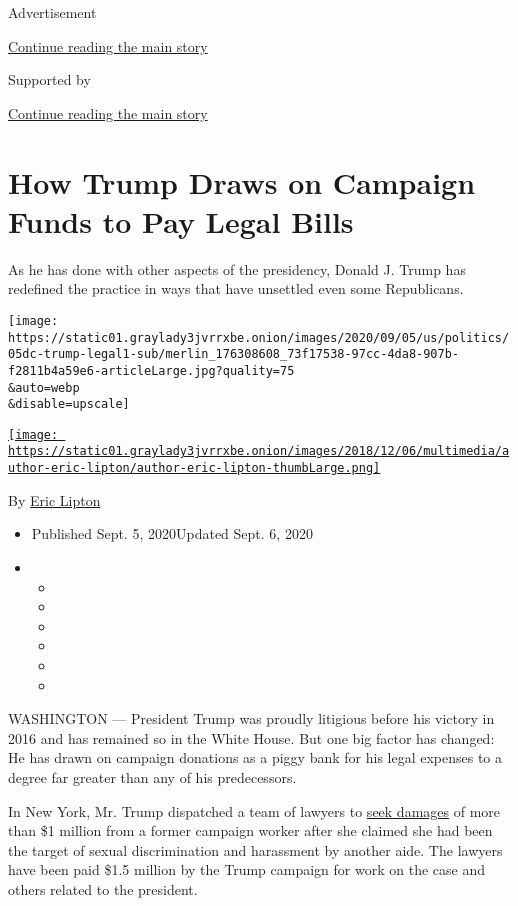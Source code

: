 Advertisement

\protect\hyperlink{after-top}{Continue reading the main story}

Supported by

\protect\hyperlink{after-sponsor}{Continue reading the main story}

\hypertarget{how-trump-draws-on-campaign-funds-to-pay-legal-bills}{%
\section{How Trump Draws on Campaign Funds to Pay Legal
Bills}\label{how-trump-draws-on-campaign-funds-to-pay-legal-bills}}

As he has done with other aspects of the presidency, Donald J. Trump has
redefined the practice in ways that have unsettled even some
Republicans.

\texttt{[image: https://static01.graylady3jvrrxbe.onion/images/2020/09/05/us/politics/05dc-trump-legal1-sub/merlin\_176308608\_73f17538-97cc-4da8-907b-f2811b4a59e6-articleLarge.jpg?quality=75\\\&auto=webp\\\&disable=upscale]}

\href{https://www.nytimes3xbfgragh.onion/by/eric-lipton}{\texttt{[image: https://static01.graylady3jvrrxbe.onion/images/2018/12/06/multimedia/author-eric-lipton/author-eric-lipton-thumbLarge.png]}}

By \href{https://www.nytimes3xbfgragh.onion/by/eric-lipton}{Eric Lipton}

\begin{itemize}
\item
  Published Sept. 5, 2020Updated Sept. 6, 2020
\item
  \begin{itemize}
  \item
  \item
  \item
  \item
  \item
  \item
  \end{itemize}
\end{itemize}

WASHINGTON --- President Trump was proudly litigious before his victory
in 2016 and has remained so in the White House. But one big factor has
changed: He has drawn on campaign donations as a piggy bank for his
legal expenses to a degree far greater than any of his predecessors.

In New York, Mr. Trump dispatched a team of lawyers to
\href{https://int.graylady3jvrrxbe.onion/data/documenttools/101616-2017-jessica-denson-v-jessica-denson-exhibit-s-17-arbitration-files/b5ecf44c5ac0c015/full.pdf}{seek
damages} of more than \$1 million from a former campaign worker after
she claimed she had been the target of sexual discrimination and
harassment by another aide. The lawyers have been paid \$1.5 million by
the Trump campaign for work on the case and others related to the
president.


